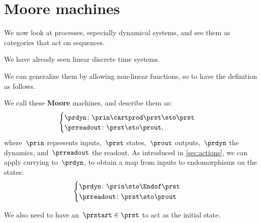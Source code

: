 
\section{Moore machines}
\label{sec:moore-machines}

We now look at processes, especially dynamical systems, and see them as categories that act on sequences.

We have already seen linear discrete time systems.

We can generalize them by allowing non-linear functions, so to have the definition as follows.

We call these \textbf{Moore} machines, and describe them as:
%
\begin{equation}
    \label{eq:moore-1}
    \begin{cases}
        \prdyn \colon \prin \cartprod \prst \sto \prst \\
        \prreadout \colon \prst \sto \prout,
    \end{cases}
\end{equation}
%
where~$\prin$ represents inputs,~$\prst$ states,~$\prout$ outputs,~$\prdyn$ the dynamics, and~$\prreadout$ the readout.
As introduced in \cref{sec:actions}, we can apply currying to~$\prdyn$, to obtain a map from inputs to endomorphisms on the states:
%
\begin{equation}
    \label{eq:moore-1-endo}
    \begin{cases}
        \prdyn \colon \prin \sto \Endof \prst \\
        \prreadout \colon \prst \sto \prout
    \end{cases}
\end{equation}
%

We also need to have an~$\prstart \in \prst$ to act as the initial state.

